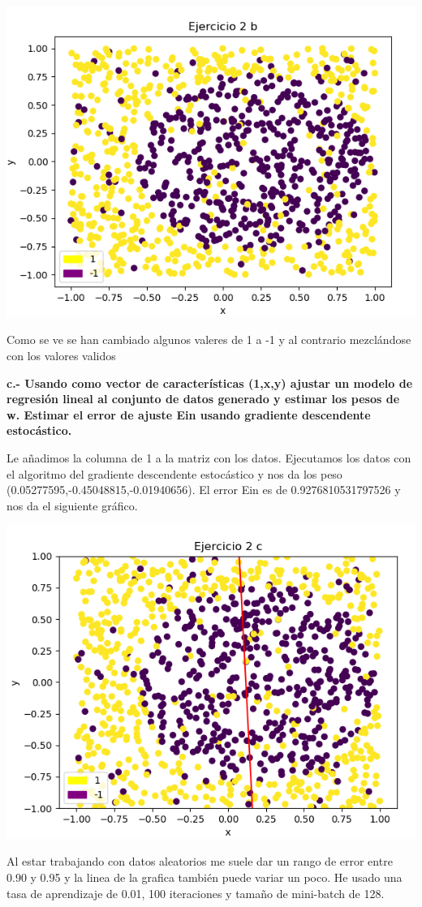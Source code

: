 \documentclass[titlepage]{article}
\begin{document}
	 \begin{center}
	 	\includegraphics[scale=0.5]{ejercicio2b.png}
	 \end{center}
 	Como se ve se han cambiado algunos valeres de 1 a -1 y al contrario mezclándose con los valores validos
 	\newline
 	
 	\textbf{c.- Usando como vector de características (1,x,y) ajustar un modelo de regresión lineal al conjunto de datos generado y estimar los pesos de w. Estimar el error de ajuste Ein usando gradiente descendente estocástico.}
 	
 	Le añadimos la columna de 1 a la matriz con los datos. Ejecutamos los datos con el algoritmo del gradiente descendente estocástico y nos da los peso (0.05277595,-0.45048815,-0.01940656). El error Ein es de 0.9276810531797526 y nos da el siguiente gráfico.
 	\begin{center}
 		\includegraphics[scale=0.5]{ejercicio2c.png}
 	\end{center}
 	Al estar trabajando con datos aleatorios me suele dar un rango de error entre 0.90 y 0.95 y la linea de la grafica también puede variar un poco.
 	He usado una tasa de aprendizaje de 0.01, 100 iteraciones y tamaño de mini-batch de 128.
 	\newline
 	
\end{document}
